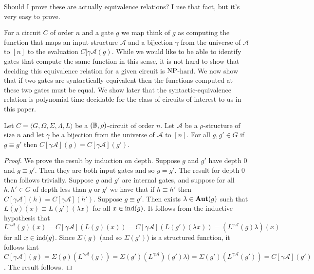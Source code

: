 \documentclass[../paper.tex]{subfiles}
\begin{document}
\begin{remark}
  Should I prove these are actually equivalence relations? I use that fact, but
  it's very easy to prove.
\end{remark}

For a circuit $C$ of order $n$ and a gate $g$ we map think of $g$ as computing
the function that maps an input structure $\mathcal{A}$ and a bijection $\gamma$
from the universe of $\mathcal{A}$ to $[n]$ to the evaluation $C[\gamma
\mathcal{A}(g)$. While we would like to be able to identify gates that compute
the same function in this sense, it is not hard to show that deciding this
equivalence relation for a given circuit is $\mathrm{NP}$-hard. We now show that if two
gates are syntactically-equivalent then the functions computed at these two
gates must be equal. We show later that the syntactic-equivalence relation is
polynomial-time decidable for the class of circuits of interest to us in this
paper.

\begin{lem}
  Let $C = \langle G, \Omega, \Sigma, \Lambda, L \rangle$ be a $(\mathbb{B},
  \rho)$-circuit of order $n$. Let $\mathcal{A}$ be a $\rho$-structure of size
  $n$ and let $\gamma$ be a bijection from the universe of $\mathcal{A}$ to
  $[n]$. For all $g, g' \in G$ if $g \equiv g'$ then $C[\gamma \mathcal{A}](g) =
  C[\gamma \mathcal{A}](g')$.
  \label{lem:syntactic-equivalence-equal-function}
\end{lem}
\begin{proof}
  We prove the result by induction on depth. Suppose $g$ and $g'$ have depth $0$
  and $g \equiv g'$. Then they are both input gates and so $g = g'$. The result
  for depth $0$ then follows trivially. Suppose $g$ and $g'$ are internal gates,
  and suppose for all $h, h' \in G$ of depth less than $g$ or $g'$ we have that
  if $h \equiv h'$ then $C[\gamma \mathcal{A}](h) = C[\gamma \mathcal{A}](h')$.
  Suppose $g \equiv g'$. Then exists $\lambda \in \text{\textbf{Aut}}(g)$ such that $L(g) (x)
  \equiv L(g') (\lambda x)$ for all $x \in \text{\upshape ind}(g)$. It follows from the
  inductive hypothesis that $L^{\gamma \mathcal{A}}(g)(x) = C[\gamma
  \mathcal{A}](L(g)(x)) = C[\gamma \mathcal{A}](L(g')(\lambda x)) = (L^{\gamma
    \mathcal{A}}(g) \lambda) (x)$ for all $x \in \text{\upshape ind}(g)$. Since $\Sigma(g)$
  (and so $\Sigma(g')$) is a structured function, it follows that $C[\gamma
  \mathcal{A}](g) = \Sigma(g)(L^{\gamma \mathcal{A}} (g)) = \Sigma(g')
  (L^{\gamma \mathcal{A}})(g') \lambda) = \Sigma(g') (L^{\gamma
    \mathcal{A}}(g')) = C[\gamma \mathcal{A}](g')$. The result follows.
\end{proof}
\end{document}
